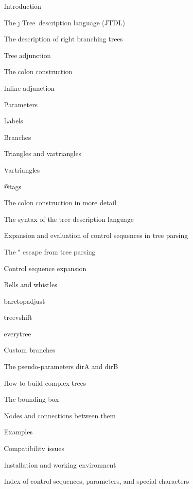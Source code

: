  {Introduction } \par
{} {The \j \kern -1.8pt Tree\ description language (JTDL) } \par
{} {The description of right branching trees} \par
{} {Tree adjunction} \par
{} {The colon construction} \par
{} {Inline adjunction} \par
{} {Parameters } \par
{} {Labels } \par
{} {Branches } \par
{} {Triangles and vartriangles } \par
{} {Vartriangles} \par
{} {@tags } \par
{} {The colon construction in more detail } \par
{} {The syntax of the tree description language} \par
{} {Expansion and evaluation of control sequences in tree parsing } \par
{} {The {\fam \ttfam \twelvett "} escape from tree parsing} \par
{} {Control sequence expansion} \par
{} {Bells and whistles } \par
{} {\fam \slfam \twelvesl baretopadjust} \par
{} {\fam \slfam \twelvesl treevshift} \par
{} {\fam \slfam \twelvesl everytree} \par
{} {Custom branches} \par
{} {The pseudo-parameters {\fam \slfam \twelvesl dirA\/} and {\fam \slfam \twelvesl dirB}} \par
{} {How to build complex trees } \par
{} {The bounding box } \par
{} {Nodes and connections between them } \par
{} {Examples } \par
{} {Compatibility issues } \par
{} {Installation and working environment} \par
\sec{} {Index of control sequences, parameters, and special
characters} \par
